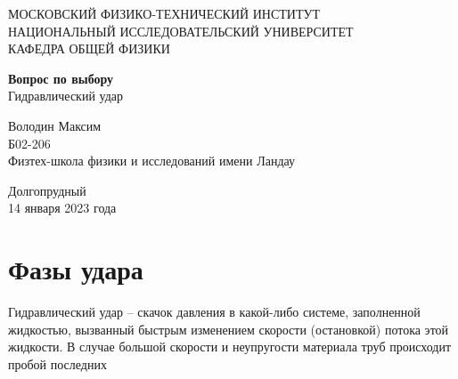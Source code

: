 \documentclass[a4paper, 14pt]{article}
\begin{document}
    \begin{titlepage}
        \begin{center}
        {\large МОСКОВСКИЙ ФИЗИКО-ТЕХНИЧЕСКИЙ ИНСТИТУТ \\ \vspace{5mm}
        НАЦИОНАЛЬНЫЙ ИССЛЕДОВАТЕЛЬСКИЙ УНИВЕРСИТЕТ \\ \vspace{5mm}
        КАФЕДРА ОБЩЕЙ ФИЗИКИ}
        \end{center}

        \begin{center}
        {\large}
        \end{center}

        \vspace{5cm}

        {\huge
            \begin{center}
                \textbf{Вопрос по выбору}
                \\ Гидравлический удар
            \end{center}
        }

        \vspace{2cm}

        \begin{flushright}
        {
            Володин Максим \\
            \vspace{2mm}
            Б02-206 \\
            \vspace{2mm}
            Физтех-школа физики и исследований имени Ландау
        }
        \end{flushright}

        \tableofcontents \vspace{6cm}

        \begin{center}
            Долгопрудный \\
            14 января 2023 года
        \end{center}

    \end{titlepage}


    \section{Фазы удара}

    Гидравлический удар -- скачок давления в какой-либо системе, заполненной жидкостью, вызванный быстрым изменением
    скорости (остановкой) потока этой жидкости.
    В случае большой скорости и неупругости материала труб происходит пробой последних
\end{document}
